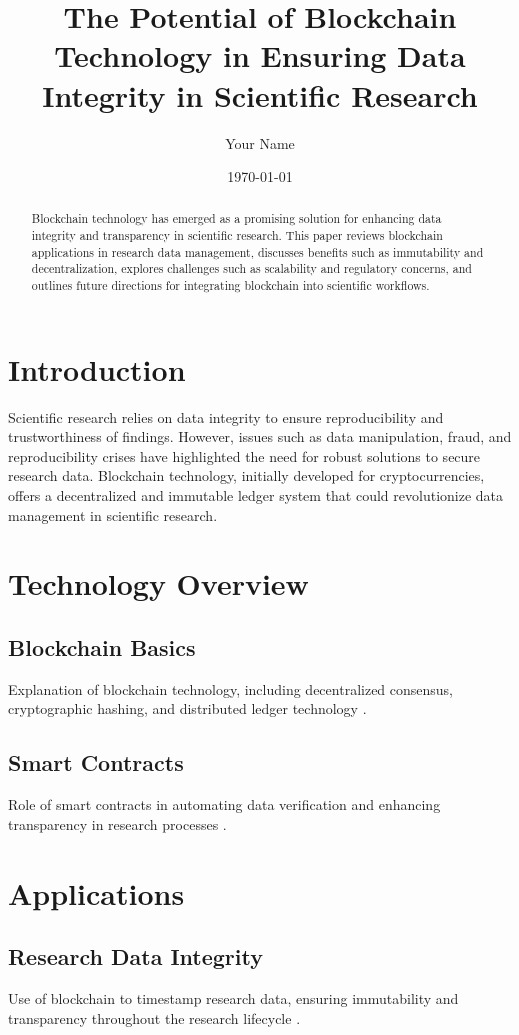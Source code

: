 \documentclass[12pt]{article}
\title{The Potential of Blockchain Technology in Ensuring Data Integrity in Scientific Research}
\author{Your Name}
\date{\today}
\begin{document}
\maketitle

\begin{abstract}
Blockchain technology has emerged as a promising solution for enhancing data integrity and transparency in scientific research. This paper reviews blockchain applications in research data management, discusses benefits such as immutability and decentralization, explores challenges such as scalability and regulatory concerns, and outlines future directions for integrating blockchain into scientific workflows.
\end{abstract}

\section{Introduction}
Scientific research relies on data integrity to ensure reproducibility and trustworthiness of findings. However, issues such as data manipulation, fraud, and reproducibility crises have highlighted the need for robust solutions to secure research data. Blockchain technology, initially developed for cryptocurrencies, offers a decentralized and immutable ledger system that could revolutionize data management in scientific research.

\section{Technology Overview}
\subsection{Blockchain Basics}
Explanation of blockchain technology, including decentralized consensus, cryptographic hashing, and distributed ledger technology \citep{nakamoto2008bitcoin, swan2015blockchain}.

\subsection{Smart Contracts}
Role of smart contracts in automating data verification and enhancing transparency in research processes \citep{buterin2013ethereum, luu2016making}.

\section{Applications}
\subsection{Research Data Integrity}
Use of blockchain to timestamp research data, ensuring immutability and transparency throughout the research lifecycle \citep{pergande2018blockchain, schiermeier2018q}.
\end{document}
